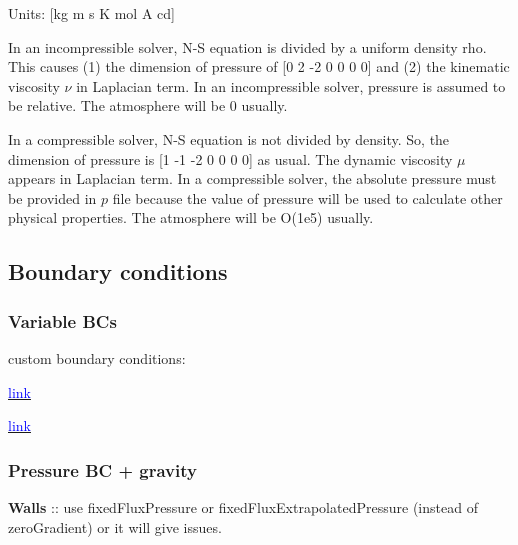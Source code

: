 \documentclass[a4paper, 12pt]{article}
\numberwithin{equation}{section}
\newcommand{\code}{\fontfamily{pcr}\selectfont}
\newcommand{\blue}[1]{\textcolor{blue}{#1}}
\begin{document}
        Units: [kg m s K mol A cd]

        In an incompressible solver, N-S equation is divided by a uniform density rho. This causes (1) the dimension of pressure of [0 2 -2 0 0 0 0] and (2) the kinematic viscosity $\nu$ in Laplacian term. In an incompressible solver, pressure is assumed to be relative. The atmosphere will be 0 usually.

        In a compressible solver, N-S equation is not divided by density. So, the dimension of pressure is [1 -1 -2 0 0 0 0] as usual. The dynamic viscosity $\mu$ appears in Laplacian term. In a compressible solver, the absolute pressure must be provided in $p$ file because the value of pressure will be used to calculate other physical properties. The atmosphere will be O(1e5) usually.

    \subsection{Boundary conditions}

        \subsubsection{Variable BCs}

            custom boundary conditions:

            \href{
            https://www.youtube.com/watch?v=3zcTxGHxuok
            }{\blue{link}}

            \href{
            https://www.cfd-online.com/Forums/openfoam-solving/119239-using-codedfixedvalue-apply-totalpressure-boundary-condition.html
            }{\blue{link}}

        \subsubsection{Pressure BC + gravity}

            \textbf{Walls} :: use {\code fixedFluxPressure} or {\code fixedFluxExtrapolatedPressure} (instead of {\code zeroGradient}) or it will give issues.

\end{document}
